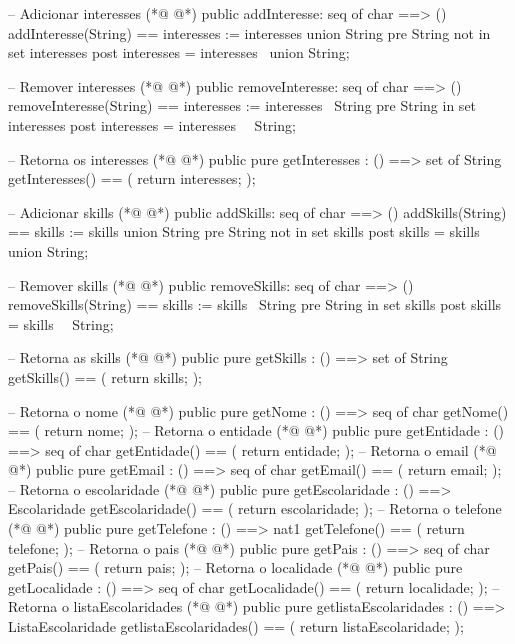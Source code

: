 \begin{vdmpp}[breaklines=true]
 -- Adicionar interesses
(*@
\label{addInteresse:71}
@*)
 public addInteresse: seq of char ==> ()
 addInteresse(String) == interesses := interesses union {String}
 pre String not in set interesses
 post interesses = interesses~ union {String};
 
 -- Remover interesses
(*@
\label{removeInteresse:77}
@*)
 public removeInteresse: seq of char ==> ()
 removeInteresse(String) == interesses := interesses \ {String}
 pre String in set interesses
 post interesses = interesses~ \ {String};
 
 -- Retorna os interesses
(*@
\label{getInteresses:83}
@*)
 public pure getInteresses : () ==> set of String
 getInteresses() ==
 (
  return interesses;
 );
 
 -- Adicionar skills
(*@
\label{addSkills:90}
@*)
 public addSkills: seq of char ==> ()
 addSkills(String) == skills := skills union {String}
 pre String not in set skills
 post skills = skills~ union {String};
 
 -- Remover skills
(*@
\label{removeSkills:96}
@*)
 public removeSkills: seq of char ==> ()
 removeSkills(String) == skills := skills \ {String}
 pre String in set skills
 post skills = skills~ \ {String};
 
 -- Retorna as skills
(*@
\label{getSkills:102}
@*)
 public pure getSkills : () ==> set of String
 getSkills() ==
 (
  return skills;
 );
 
 -- Retorna o nome
(*@
\label{getNome:109}
@*)
 public pure getNome : () ==> seq of char
 getNome() ==
 (
  return nome;
 );
 -- Retorna o entidade
(*@
\label{getEntidade:115}
@*)
 public pure getEntidade : () ==> seq of char
 getEntidade() ==
 (
  return entidade;
 );
 -- Retorna o email
(*@
\label{getEmail:121}
@*)
 public pure getEmail : () ==> seq of char
 getEmail() ==
 (
  return email;
 );
 -- Retorna o escolaridade
(*@
\label{getEscolaridade:127}
@*)
 public pure getEscolaridade : () ==> Escolaridade
 getEscolaridade() ==
 (
  return escolaridade;
 );
 -- Retorna o telefone
(*@
\label{getTelefone:133}
@*)
 public pure getTelefone : () ==> nat1
 getTelefone() ==
 (
  return telefone;
 );
 -- Retorna o pais
(*@
\label{getPais:139}
@*)
 public pure getPais : () ==> seq of char
 getPais() ==
 (
  return pais;
 );
 -- Retorna o localidade
(*@
\label{getLocalidade:145}
@*)
 public pure getLocalidade : () ==> seq of char
 getLocalidade() ==
 (
  return localidade;
 );
 -- Retorna o listaEscolaridades
(*@
\label{getlistaEscolaridades:151}
@*)
 public pure getlistaEscolaridades : () ==> ListaEscolaridade
 getlistaEscolaridades() ==
 (
  return listaEscolaridade;
 );
 

\end{vdmpp}
